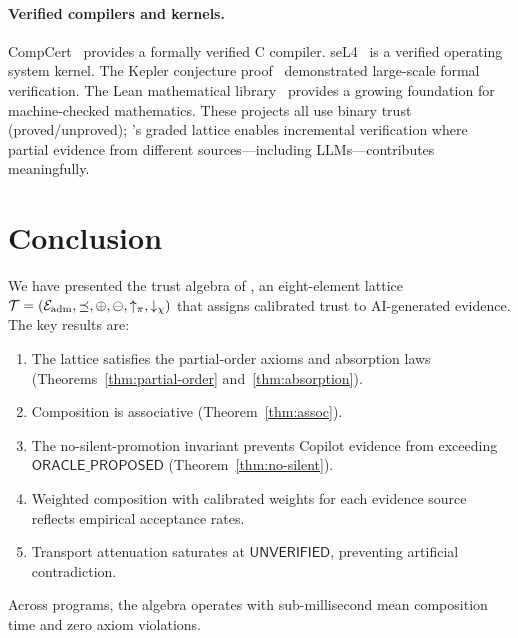 \documentclass[11pt]{article}
\newcommand{\TAlg}{\mathcal{T}}
\newcommand{\OracProp}{\mathsf{ORACLE\_PROPOSED}}
\newcommand{\Unver}{\mathsf{UNVERIFIED}}
\begin{document}
\paragraph{Verified compilers and kernels.}
CompCert~\cite{blazy2006formal} provides a formally verified C compiler.
seL4~\cite{klein2009sel4} is a verified operating system kernel.  The Kepler
conjecture proof~\cite{hales2017formal} demonstrated large-scale formal
verification.  The Lean mathematical library~\cite{mathlib2020} provides a
growing foundation for machine-checked mathematics.  These projects all use
binary trust (proved/unproved); \JuGeo's graded lattice enables incremental
verification where partial evidence from different sources---including
LLMs---contributes meaningfully.

\section{Conclusion}\label{sec:conclusion}

We have presented the trust algebra of \JuGeo, an eight-element lattice
$\TAlg = (\Eadm, \tleq, \tjoin, \tatten, \tpromote, \tdemote)$ that assigns
calibrated trust to AI-generated evidence.  The key results are:

\begin{enumerate}[leftmargin=2em]
  \item The lattice satisfies the partial-order axioms and absorption laws
        (Theorems~\ref{thm:partial-order} and~\ref{thm:absorption}).
  \item Composition is associative (Theorem~\ref{thm:assoc}).
  \item The no-silent-promotion invariant prevents Copilot evidence from
        exceeding $\OracProp$ (Theorem~\ref{thm:no-silent}).
  \item Weighted composition with calibrated weights for each
        evidence source reflects empirical acceptance rates.
  \item Transport attenuation saturates at $\Unver$, preventing
        artificial contradiction.
\end{enumerate}

Across \expTotalPrograms{} programs, the algebra operates with sub-millisecond
mean composition time and zero axiom violations.
\end{document}
